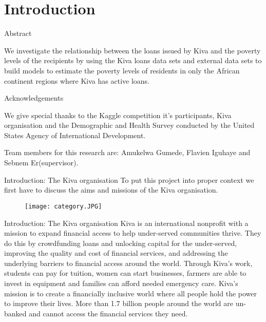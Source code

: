 \documentclass[10pt]{beamer}
\begin{document}
\section{Introduction}
\begin{frame}{Abstract }

We investigate the relationship between the loans issued by Kiva and the poverty levels of the recipients by using  the Kiva loans data sets and external data sets to build models to estimate the poverty levels of residents in only the African continent regions where Kiva has active loans.


\end{frame}

\begin{frame}{Acknowledgements}

We give special thanks to the Kaggle competition it's participants, Kiva organisation and the Demographic and Health Survey conducted by the United States Agency of International Development.

\scriptsize


\vspace{1cm}
Team members for this research are: Amukelwa Gumede, Flavien Iguhaye and Sebnem Er(supervisor).




\end{frame}


%

\begin{frame}{Introduction: The Kiva organisation}
To put this project into proper context we first have to discuss the aims and missions of the Kiva organisation. 

\begin{figure}
    \centering
    \texttt{[image: category.JPG]}
\end{figure}

\end{frame}

\begin{frame}{Introduction: The Kiva organisation}
Kiva is an international nonprofit with a mission to expand financial access to help under-served communities thrive. They do this by crowdfunding loans and unlocking capital for the under-served, improving the quality and cost of financial services, and addressing the underlying barriers to financial access around the world. Through Kiva's work, students can pay for tuition, women can start businesses, farmers are able to invest in equipment and families can afford needed emergency care. Kiva's mission is to create a financially inclusive world where all people hold the power to improve their lives. More than 1.7 billion people around the world are un-banked and cannot access the financial services they need. 

\end{frame}
\end{document}
